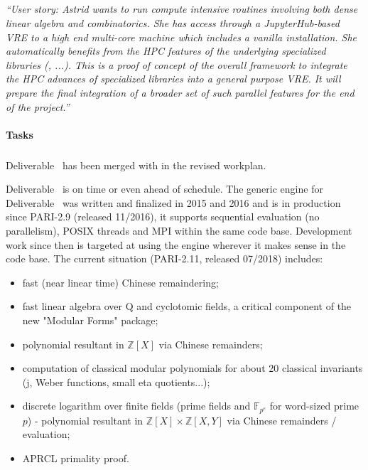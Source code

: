\subparagraph{}

\emph{“User story: Astrid wants to run compute intensive routines
    involving both dense linear algebra and combinatorics. She has
    access through a JupyterHub-based VRE to a high end multi-core
    machine which includes a vanilla \Sage installation. She
    automatically benefits from the HPC features of the underlying
    specialized libraries (\Linbox, ...). This is a proof of concept
    of the overall framework to integrate the HPC advances of
    specialized libraries into a general purpose VRE.
    It will prepare the final integration of a broader set of such
    parallel features for the end of the project.”}


\paragraph{Tasks}

\subparagraph{}
Deliverable~ has been merged
 with  in the revised workplan.

Deliverable~ is on time or even ahead of schedule.
The generic engine for Deliverable~ was written and
finalized in 2015 and 2016 and is in production since PARI-2.9 (released
11/2016), it supports sequential evaluation (no parallelism), POSIX threads and
MPI within the same code base.
Development work since then is targeted at using the engine wherever it makes
sense in the code base. The current situation (PARI-2.11, released 07/2018)
includes:
\begin{itemize}
\item fast (near linear time) Chinese remaindering;
\item fast linear algebra over Q and cyclotomic fields, a critical component of
the new "Modular Forms" package;
\item polynomial resultant in $\mathbb{Z}[X]$ via Chinese remainders;
\item computation of classical modular polynomials for about 20 classical
invariants (j, Weber functions, small eta quotients...);
\item discrete logarithm over finite fields (prime fields and
$\mathbb{F}_{p^e}$ for word-sized prime $p$) - polynomial resultant in
$\mathbb{Z}[X] \times \mathbb{Z}[X,Y]$ via 
Chinese remainders / evaluation;
\item APRCL primality proof.
\end{itemize}


